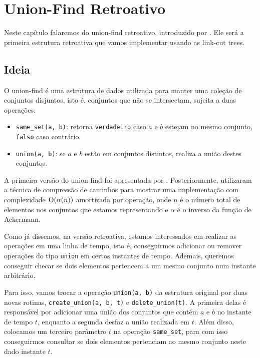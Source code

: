 
\chapter{Union-Find Retroativo}
\label{cap:union-find}

Neste capítulo falaremos do union-find retroativo, introduzido por \citet{10.1145/1240233.1240236}. Ele será a primeira estrutura retroativa que vamos implementar usando as link-cut trees.

\section{Ideia}
\label{sec:uf-ideia}

O union-find é uma estrutura de dados utilizada para manter uma coleção de conjuntos disjuntos, isto é, conjuntos que não se intersectam, sujeita a duas operações:

\begin{itemize}
    \item \texttt{same\_set(a, b)}: retorna \texttt{verdadeiro} caso $a$ e $b$ estejam no mesmo conjunto, \texttt{falso} caso contrário.
    \item \texttt{union(a, b)}: se $a$ e $b$ estão em conjuntos distintos, realiza a união destes conjuntos.
\end{itemize}

A primeira versão do union-find foi apresentada por \citet{10.1145/364099.364331}. Posteriormente, \citet{10.1145/62.2160} utilizaram a técnica de compressão de caminhos para mostrar uma implementação com complexidade $\mathrm{O}( \alpha (n) )$ amortizada por operação, onde $n$ é o número total de elementos nos conjuntos que estamos representando e $\alpha$ é o inverso da função de Ackermann.

Como já dissemos, na versão retroativa, estamos interessados em realizar as operações em uma linha de tempo, isto é, conseguirmos adicionar ou remover operações do tipo \texttt{union} em certos instantes de tempo. Ademais, queremos conseguir checar se dois elementos pertencem a um mesmo conjunto num instante arbitrário.

Para isso, vamos trocar a operação \texttt{union(a, b)} da estrutura original por duas novas rotinas, \texttt{create\_union(a, b, t)} e \texttt{delete\_union(t)}. A primeira delas é responsável por adicionar uma união dos conjuntos que contém $a$ e $b$ no instante de tempo $t$, enquanto a segunda desfaz a união realizada em $t$. Além disso, colocamos um terceiro parâmetro $t$ na operação \texttt{same\_set}, para com isso conseguirmos consultar se dois elementos pertenciam ao mesmo conjunto neste dado instante $t$.


